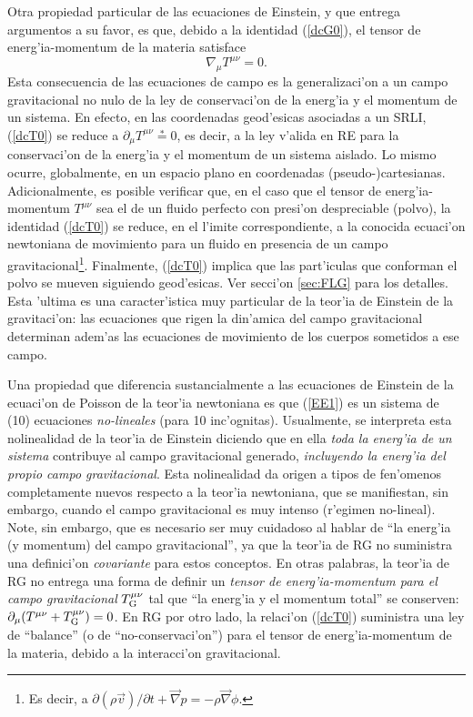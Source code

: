 Otra propiedad particular de las ecuaciones de Einstein, y que entrega argumentos a su favor, es que, debido a la identidad (\ref{dcG0}), el tensor de energ'ia-momentum de la materia satisface
\begin{equation}
 \nabla_\mu T^{\mu\nu}= 0. \label{dcT0}
\end{equation}
Esta consecuencia de las ecuaciones de campo es la generalizaci'on a un campo
gravitacional no nulo de la ley de conservaci'on de la energ'ia y el momentum
de un sistema. En efecto, en las coordenadas geod'esicas asociadas a un SRLI,  (\ref{dcT0}) se reduce a $\partial_\mu T^{\mu\nu}\stackrel{*}{=}0$, es decir, a la ley v'alida en RE para la conservaci'on de la energ'ia y el momentum de un sistema aislado. Lo mismo ocurre, globalmente, en un espacio plano en coordenadas (pseudo-)cartesianas. Adicionalmente, es posible verificar que, en el caso que el tensor de energ'ia-momentum $T^{\mu\nu}$ sea el de un fluido perfecto con presi'on despreciable (polvo), la identidad (\ref{dcT0}) se reduce, en el l'imite correspondiente, a la conocida ecuaci'on newtoniana de movimiento para un fluido en presencia de un campo gravitacional\footnote{Es decir, a $\partial(\rho\vec{v})/\partial t+\vec\nabla p=-\rho\vec\nabla\phi$.}. Finalmente, (\ref{dcT0}) implica que las part'iculas que conforman el polvo se mueven siguiendo geod'esicas. Ver secci'on \ref{sec:FLG} para los detalles. Esta 'ultima es una caracter'istica muy particular de la teor'ia de Einstein de la gravitaci'on: las ecuaciones que rigen la din'amica del campo gravitacional determinan adem'as las ecuaciones de movimiento de los cuerpos sometidos a ese campo.

Una propiedad que diferencia sustancialmente a las ecuaciones de Einstein de
la ecuaci'on de Poisson de la teor'ia newtoniana es que (\ref{EE1}) es un
sistema de (10) ecuaciones \textit{no-lineales} (para 10 inc'ognitas).
Usualmente, se interpreta esta nolinealidad de la teor'ia de Einstein diciendo
que en ella \textit{toda la energ'ia de un sistema} contribuye al campo
gravitacional generado, \textit{incluyendo la energ'ia del propio campo
gravitacional}. Esta nolinealidad da origen a tipos de fen'omenos completamente
nuevos respecto a la teor'ia newtoniana, que se manifiestan, sin embargo,
cuando el campo gravitacional es muy intenso (r'egimen no-lineal). Note, sin embargo, que es necesario ser muy cuidadoso al hablar de ``la energ'ia (y momentum) del campo gravitacional'', ya que la teor'ia de RG no suministra una definici'on \textit{covariante} para estos conceptos. En otras palabras, la teor'ia de RG no entrega una forma de definir un \textit{tensor de energ'ia-momentum para el campo gravitacional} $T^{\mu\nu}_{\rm G}$ tal que ``la energ'ia y el momentum total'' se conserven: $\partial_\mu(T^{\mu\nu}+T^{\mu\nu}_{\rm G})=0$. En RG por otro lado, la relaci'on  (\ref{dcT0}) suministra una ley de ``balance'' (o de ``no-conservaci'on'') para el tensor de energ'ia-momentum de la materia, debido a la interacci'on gravitacional.

